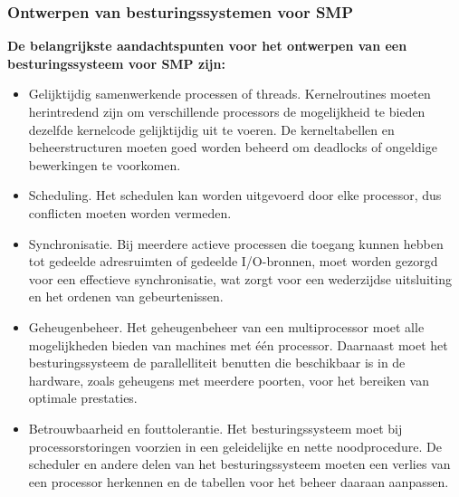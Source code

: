 \subsubsection{Ontwerpen van besturingssystemen voor SMP}

\textbf{De belangrijkste aandachtspunten voor het ontwerpen van een besturingssysteem voor SMP zijn:}

\begin{itemize}
\item Gelijktijdig samenwerkende processen of threads. Kernelroutines moeten herintredend zijn om verschillende processors de mogelijkheid te bieden dezelfde kernelcode gelijktijdig uit te voeren. De kerneltabellen en beheerstructuren moeten goed worden beheerd om deadlocks of ongeldige bewerkingen te voorkomen.
\item Scheduling. Het schedulen kan worden uitgevoerd door elke processor, dus conflicten moeten worden vermeden.
\item Synchronisatie. Bij meerdere actieve processen die toegang kunnen hebben tot gedeelde adresruimten of gedeelde I/O-bronnen, moet worden gezorgd voor een effectieve synchronisatie, wat zorgt voor een wederzijdse uitsluiting en het ordenen van gebeurtenissen.
\item Geheugenbeheer. Het geheugenbeheer van een multiprocessor moet alle mogelijkheden bieden van machines met één processor. Daarnaast moet het besturingssysteem de parallelliteit benutten die beschikbaar is in de hardware, zoals geheugens met meerdere poorten, voor het bereiken van optimale prestaties.
\item Betrouwbaarheid en fouttolerantie. Het besturingssysteem moet bij processorstoringen voorzien in een geleidelijke en nette noodprocedure. De scheduler en andere delen van het besturingssysteem moeten een verlies van een processor herkennen en de tabellen voor het beheer daaraan aanpassen.
\end{itemize}
